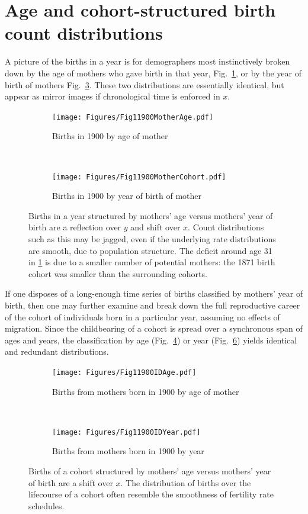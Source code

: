 \documentclass{article}
\begin{document}
\section{Age and cohort-structured birth count distributions}
A picture of the births in a year is for demographers most instinctively broken down by the age of mothers who gave birth in that year, Fig.~\ref{fig:agemother}, or by the year of birth of mothers Fig.~\ref{fig:cohmother}. These two distributions are essentially identical, but appear as mirror images if chronological time is enforced in $x$.

\begin{figure}[ht!]
\begin{subfigure}[t]{0.5\textwidth}
        \centering
        \texttt{[image: Figures/Fig11900MotherAge.pdf]}
        \caption{Births in 1900 by age of mother}
        \label{fig:agemother}
\end{subfigure}
~
\begin{subfigure}[t]{0.5\textwidth}
        \centering
        \texttt{[image: Figures/Fig11900MotherCohort.pdf]}
        \caption{Births in 1900 by year of birth of mother}
          \label{fig:cohmother}
\end{subfigure}
\caption{Births in a year structured by mothers' age versus mothers' year of birth are a
reflection over $y$ and shift over $x$. Count distributions such as this may be jagged, even if the underlying rate distributions are smooth, due to population structure. The deficit around age 31 in \ref{fig:agemother} is due to a smaller number of potential mothers: the 1871 birth cohort was smaller than the surrounding cohorts.}
\end{figure}

If one disposes of a long-enough time series of births classified by mothers' year of birth, then one may further examine and break down the full reproductive career of the cohort of individuals born in a particular year, assuming no effects of migration. Since the childbearing of a cohort is spread over a synchronous span of ages and years, the classification by age (Fig.~\ref{fig:age1900mother}) or year (Fig.~\ref{fig:year1900}) yields identical and redundant distributions.

\begin{figure}[ht!]
\begin{subfigure}[t]{0.5\textwidth}
        \centering
        \texttt{[image: Figures/Fig11900IDAge.pdf]}
        \caption{Births from mothers born in 1900 by age of mother}
        \label{fig:age1900mother}
\end{subfigure}
~
\begin{subfigure}[t]{0.5\textwidth}
        \centering
        \texttt{[image: Figures/Fig11900IDYear.pdf]}
        \caption{Births from mothers born in 1900 by year}
          \label{fig:year1900}
\end{subfigure}
\caption{Births of a cohort structured by mothers' age versus mothers' year of birth are a
shift over $x$. The distribution of births over the lifecourse of a cohort often resemble the smoothness of fertility rate schedules.}
\end{figure}
\end{document}
